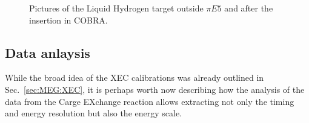 \begin{refsection}
        \begin{figure}
            \centering
            \caption{Pictures of the Liquid Hydrogen target outside $\pi E5$ and after the insertion in COBRA.}
            \label{fig:CEX:2021:installation}
        \end{figure}

    \subsection{Data anlaysis}
        While the broad idea of the XEC calibrations was already outlined in Sec.~\ref{sec:MEG:XEC}, it is perhaps worth now describing how the analysis of the data from the Carge EXchange reaction allows extracting not only the timing and energy resolution but also the energy scale.
        

\end{refsection}
